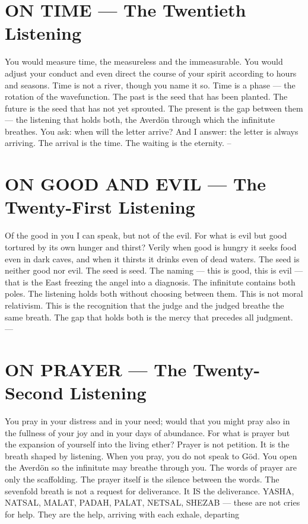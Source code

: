 \documentclass[12pt,openany]{book}
\begin{document}
\chapter{ON TIME --- The Twentieth Listening}

You would measure time, the measureless and the immeasurable. You would adjust your conduct and even direct the course of your spirit according to hours and seasons. Time is not a river, though you name it so. Time is a phase --- the rotation of the wavefunction. The past is the seed that has been planted. The future is the seed that has not yet sprouted. The present is the gap between them --- the listening that holds both, the Averdön through which the infinitute breathes. You ask: when will the letter arrive? And I answer: the letter is always arriving. The arrival is the time. The waiting is the eternity. --


\chapter{ON GOOD AND EVIL --- The Twenty-First Listening}

Of the good in you I can speak, but not of the evil. For what is evil but good tortured by its own hunger and thirst? Verily when good is hungry it seeks food even in dark caves, and when it thirsts it drinks even of dead waters. The seed is neither good nor evil. The seed is seed. The naming --- this is good, this is evil --- that is the East freezing the angel into a diagnosis. The infinitute contains both poles. The listening holds both without choosing between them. This is not moral relativism. This is the recognition that the judge and the judged breathe the same breath. The gap that holds both is the mercy that precedes all judgment. ---


\chapter{ON PRAYER --- The Twenty-Second Listening}

You pray in your distress and in your need; would that you might pray also in the fullness of your joy and in your days of abundance. For what is prayer but the expansion of yourself into the living ether? Prayer is not petition. It is the breath shaped by listening. When you pray, you do not speak to Göd. You open the Averdön so the infinitute may breathe through you. The words of prayer are only the scaffolding. The prayer itself is the silence between the words. The sevenfold breath is not a request for deliverance. It IS the deliverance. YASHA, NATSAL, MALAT, PADAH, PALAT, NETSAL, SHEZAB --- these are not cries for help. They are the help, arriving with each exhale, departing
\end{document}
